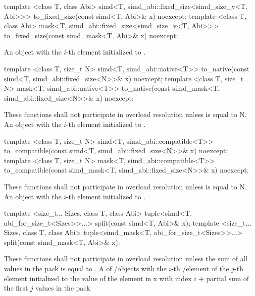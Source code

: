 \begin{itemdecl}
template <class T, class Abi>
simd<T, simd_abi::fixed_size<simd_size_v<T, Abi>>> to_fixed_size(const simd<T, Abi>& x) noexcept;
template <class T, class Abi>
mask<T, simd_abi::fixed_size<simd_size_v<T, Abi>>> to_fixed_size(const simd_mask<T, Abi>& x) noexcept;
\end{itemdecl}
\begin{itemdescr}
  \pnum\returns An object with the $i$-th element initialized to .
\end{itemdescr}

\begin{itemdecl}
template <class T, size_t N>
simd<T, simd_abi::native<T>> to_native(const simd<T, simd_abi::fixed_size<N>>& x) noexcept;
template <class T, size_t N>
mask<T, simd_abi::native<T>> to_native(const simd_mask<T, simd_abi::fixed_size<N>>& x) noexcept;
\end{itemdecl}
\begin{itemdescr}
  \pnum\remarks These functions shall not participate in overload resolution unless  is equal to \code N.
  \pnum\returns An object with the $i$-th element initialized to .
\end{itemdescr}

\begin{itemdecl}
template <class T, size_t N>
simd<T, simd_abi::compatible<T>> to_compatible(const simd<T, simd_abi::fixed_size<N>>& x) noexcept;
template <class T, size_t N>
mask<T, simd_abi::compatible<T>> to_compatible(const simd_mask<T, simd_abi::fixed_size<N>>& x) noexcept;
\end{itemdecl}
\begin{itemdescr}
  \pnum\remarks These functions shall not participate in overload resolution unless  is equal to \code N.
  \pnum\returns An object with the $i$-th element initialized to .
\end{itemdescr}

\begin{itemdecl}
template <size_t... Sizes, class T, class Abi>
tuple<simd<T, abi_for_size_t<Sizes>>...> split(const simd<T, Abi>& x);
template <size_t... Sizes, class T, class Abi>
tuple<simd_mask<T, abi_for_size_t<Sizes>>...> split(const simd_mask<T, Abi>& x);
\end{itemdecl}
\begin{itemdescr}
  \pnum\remarks These functions shall not participate in overload resolution unless the sum of all values in the  pack is equal to .
  \pnum\returns A  of \simd/\mask objects with the $i$-th \simd/\mask element of the $j$-th  element initialized to the value of the element in \code x with index $i$ + partial sum of the first $j$ values in the  pack.
\end{itemdescr}

